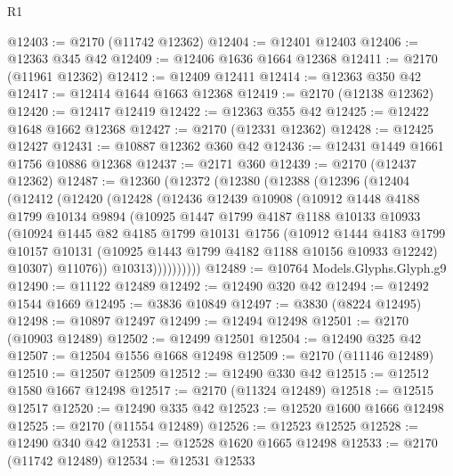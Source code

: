 \begin{lexlean}{R1}
\begin{coremodule}
@12403 := @2170 (@11742 @12362)
@12404 := @12401 @12403
@12406 := @12363 @345 @42
@12409 := @12406 @1636 @1664 @12368
@12411 := @2170 (@11961 @12362)
@12412 := @12409 @12411
@12414 := @12363 @350 @42
@12417 := @12414 @1644 @1663 @12368
@12419 := @2170 (@12138 @12362)
@12420 := @12417 @12419
@12422 := @12363 @355 @42
@12425 := @12422 @1648 @1662 @12368
@12427 := @2170 (@12331 @12362)
@12428 := @12425 @12427
@12431 := @10887 @12362 @360 @42
@12436 := @12431 @1449 @1661 @1756 @10886 @12368
@12437 := @2171 @360
@12439 := @2170 (@12437 @12362)
@12487 := @12360
    (@12372
      (@12380
        (@12388
          (@12396
            (@12404
              (@12412
                (@12420
                  (@12428
                    (@12436
                      @12439
                      @10908
                      (@10912
                        @1448
                        @4188
                        @1799
                        @10134
                        @9894
                        (@10925
                          @1447
                          @1799
                          @4187
                          @1188
                          @10133
                          @10933
                          (@10924
                            @1445
                            @82
                            @4185
                            @1799
                            @10131
                            @1756
                            (@10912
                              @1444
                              @4183
                              @1799
                              @10157
                              @10131
                              (@10925 @1443 @1799 @4182 @1188 @10156 @10933 @12242)
                              @10307)
                            @11076))
                        @10313))))))))))
@12489 := @10764 Models.Glyphs.Glyph.g9
@12490 := @11122 @12489
@12492 := @12490 @320 @42
@12494 := @12492 @1544 @1669
@12495 := @3836 @10849
@12497 := @3830 (@8224 @12495)
@12498 := @10897 @12497
@12499 := @12494 @12498
@12501 := @2170 (@10903 @12489)
@12502 := @12499 @12501
@12504 := @12490 @325 @42
@12507 := @12504 @1556 @1668 @12498
@12509 := @2170 (@11146 @12489)
@12510 := @12507 @12509
@12512 := @12490 @330 @42
@12515 := @12512 @1580 @1667 @12498
@12517 := @2170 (@11324 @12489)
@12518 := @12515 @12517
@12520 := @12490 @335 @42
@12523 := @12520 @1600 @1666 @12498
@12525 := @2170 (@11554 @12489)
@12526 := @12523 @12525
@12528 := @12490 @340 @42
@12531 := @12528 @1620 @1665 @12498
@12533 := @2170 (@11742 @12489)
@12534 := @12531 @12533

\end{coremodule}
\end{lexlean}
